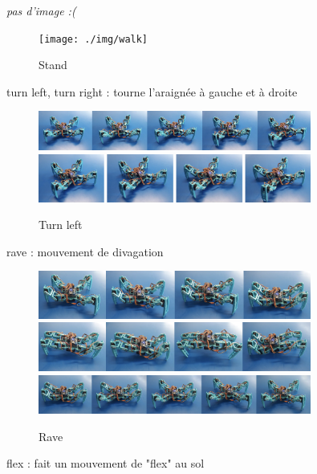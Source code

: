 \textit{pas d'image :(}

\begin{figure}
	\begin{center}
		\texttt{[image: ./img/walk]}
		\caption{Stand}
	\end{center}
\end{figure}

turn left, turn right : tourne l'araignée à gauche et à droite

\begin{figure}
	\begin{center}
		\includegraphics[width=0.8\textwidth]{./img/turn_left_1}
		\includegraphics[width=0.8\textwidth]{./img/turn_left_2}
		\caption{Turn left}
	\end{center}
\end{figure}

rave : mouvement de divagation

\begin{figure}
	\begin{center}
		\includegraphics[width=0.8\textwidth]{./img/rave_1}
		\includegraphics[width=0.8\textwidth]{./img/rave_2}
		\includegraphics[width=0.8\textwidth]{./img/rave_3}
		\caption{Rave}
	\end{center}
\end{figure}

flex : fait un mouvement de "flex" au sol

